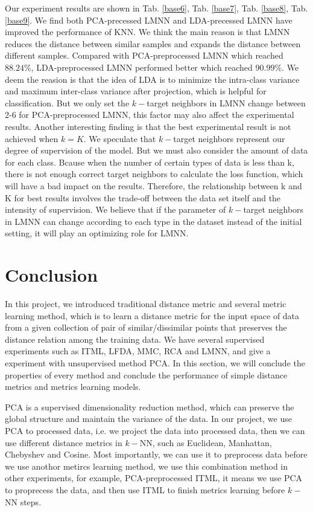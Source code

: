 \documentclass[conference]{IEEEtran}
\begin{document}
Our experiment results are shown in Tab. \ref{base6}, Tab. \ref{base7}, Tab. \ref{base8}, Tab. \ref{base9}. We find both PCA-precessed LMNN and LDA-precessed LMNN have improved the performance of KNN. We think the main reason is that LMNN reduces the distance between similar samples and expands the distance between different samples. Compared with PCA-preprocessed LMNN which reached $88.24\%$, LDA-preprocessed LMNN performed better which reached $90.99\%$. We deem the reasion is that the idea of LDA is to minimize the intra-class variance and maximum inter-class variance after projection, which is helpful for classification. But we only set the $k-$target neighbors in LMNN change between 2-6 for PCA-preprocessed LMNN, this factor may also affect the experimental results. Another interesting finding is that the best experimental result is not achieved when $k = K$. We speculate that $k-$target neighbors represent our degree of supervision of the model. But we must also consider the amount of data for each class. Bcause when the number of certain types of data is less than k, there is not enough correct target neighbors to calculate the loss function, which will have a bad impact on the results. Therefore, the relationship between k and K for best results involves the trade-off between the data set itself and the intensity of supervision. We believe that if the parameter of $k-$target neighbors in LMNN can change according to each type in the dataset instead of the initial setting, it will play an optimizing role for LMNN.

\section{Conclusion}

In this project, we introduced traditional distance metric and several metric learning method, which is to learn a distance metric for the input space of data from a given collection of pair of similar/dissimilar points that preserves the distance relation among the training data. We have several supervised experiments such as ITML, LFDA, MMC, RCA and LMNN, and give a experiment with unsupervised method PCA. In this section, we will conclude the properties of every method and conclude the performance of simple distance metrics and metrics learning models.

PCA is a supervised dimensionality reduction method, which can preserve the global structure and maintain the variance of the data. In our project, we use PCA to processed data, i.e. we project the data into processed data, then we can use different distance metrics in $k-$NN, such as Euclidean, Manhattan, Chebyshev and Cosine. Most importantly, we can use it to preprocess data before we use anothor metircs learning method, we use this combination method in other experiments, for example, PCA-preprocessed ITML, it means we use PCA to proprecess the data, and then use ITML to finish metrics learning before $k-$NN steps.
\end{document}
